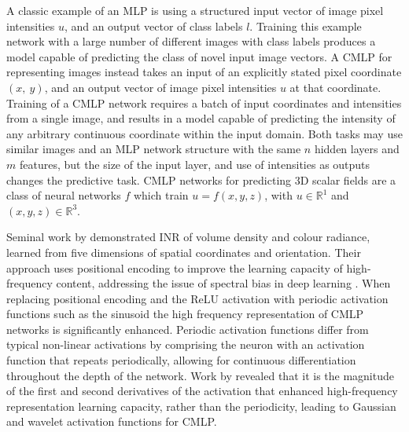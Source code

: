 A classic example of an MLP is using a structured input vector of image pixel intensities \(u\), and an output vector of class labels \(l\).
Training this example network with a large number of different images with class labels produces a model capable of predicting the class of novel input image vectors.
A CMLP for representing images instead takes an input of an explicitly stated pixel coordinate \((x,\ y)\), and an output vector of image pixel intensities \(u\) at that coordinate.
Training of a CMLP network requires a batch of input coordinates and intensities from a single image, and results in a model capable of predicting the intensity of any arbitrary continuous coordinate within the input domain.
Both tasks may use similar images and an MLP network structure with the same \(n\) hidden layers and \(m\) features, but the size of the input layer, and use of intensities as outputs changes the predictive task.
CMLP networks for predicting 3D scalar fields are a class of neural networks \(f\) which train \(u = f(x, y, z)\), with \(u\in\mathbb{R}^1\) and \((x, y, z)\in\mathbb{R}^3\).

Seminal work by \textcite{mildenhallNeRFRepresentingScenes2020} demonstrated INR of volume density and colour radiance, learned from five dimensions of spatial coordinates and orientation.
Their approach uses positional encoding to improve the learning capacity of high-frequency content, addressing the issue of spectral bias in deep learning \parencite{rahamanSpectralBiasNeural2019}.
When replacing positional encoding and the ReLU activation with periodic activation functions such as the sinusoid \parencite{sitzmann2019siren} the high frequency representation of CMLP networks is significantly enhanced.
Periodic activation functions differ from typical non-linear activations by comprising the neuron with an activation function that repeats periodically, allowing for continuous differentiation throughout the depth of the network.
Work by \textcite{ramasinghePeriodicityUnifyingFramework2022} revealed that it is the magnitude of the first and second derivatives of the activation that enhanced high-frequency representation learning capacity, rather than the periodicity, leading to Gaussian \parencite{ramasinghePeriodicityUnifyingFramework2022} and wavelet \parencite{saragadamWIREWaveletImplicit2023} activation functions for CMLP\@.

